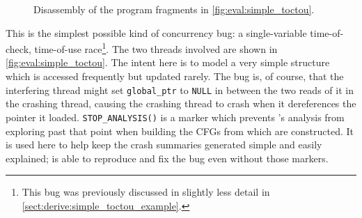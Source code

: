 \begin{figure}
  \hspace{-5mm}
  \caption{Disassembly of the program fragments in
    \autoref{fig:eval:simple_toctou}.}
  \label{fig:eval:simple_toctou:compiled}
\end{figure}

This is the simplest possible kind of concurrency bug: a
single-variable time-of-check, time-of-use race\footnote{This bug was
  previously discussed in slightly less detail in
  \autoref{sect:derive:simple_toctou_example}.}.  The two threads
involved are shown in \autoref{fig:eval:simple_toctou}.  The intent
here is to model a very simple structure which is accessed frequently
but updated rarely.  The bug is, of course, that the interfering
thread might set \texttt{global\_ptr} to \texttt{NULL} in between the
two reads of it in the crashing thread, causing the crashing thread to
crash when it dereferences the pointer it loaded.
\texttt{STOP\_ANALYSIS()} is a marker which prevents {\technique}'s
analysis from exploring past that point when building the CFGs from
which {\StateMachines} are constructed.  It is used here to help keep
the crash summaries generated simple and easily explained;
{\implementation} is able to reproduce and fix the bug even without
those markers.

